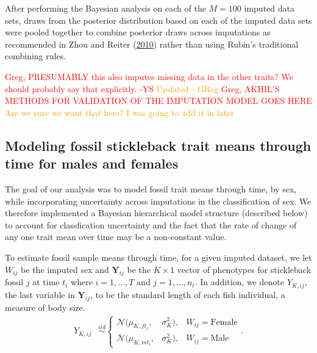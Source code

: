 \documentclass[
  12pt,
]{article}
\begin{document}
After performing the Bayesian analysis on each of the \(M = 100\)
imputed data sets, draws from the posterior distribution based on each
of the imputed data sets were pooled together to combine posterior draws
across imputations as recommended in Zhou and Reiter
(\protect\hyperlink{ref-ZhouReiter2010}{2010}) rather than using Rubin's
traditional combining rules.

\textcolor{red}{Greg, PRESUMABLY this also imputes missing data in the other traits? We should probably say that explicitly. -YS}
\textcolor{orange}{Updated - GReg}
\textcolor{red}{Greg, AKHIL'S METHODS FOR VALIDATION OF THE IMPUTATION MODEL GOES HERE}
\textcolor{orange}{Are we sure we want that here?  I was going to add it in later}

\hypertarget{modeling-fossil-stickleback-trait-means-through-time-for-males-and-females}{%
\subsection{Modeling fossil stickleback trait means through time for
males and
females}\label{modeling-fossil-stickleback-trait-means-through-time-for-males-and-females}}

The goal of our analysis was to model fossil trait means through time,
by sex, while incorporating uncertainty across imputations in the
classification of sex. We therefore implemented a Bayesian hierarchical
model structure (described below) to account for classfication
uncertainty and the fact that the rate of change of any one trait mean
over time may be a non-constant value.

To estimate fossil sample means through time, for a given imputed
dataset, we let \(W_{ij}\) be the imputed sex and
\(\boldsymbol{Y}_{ij}\) be the \(K \times 1\) vector of phenotypes for
stickleback fossil \(j\) at time \(t_i\) where \(i = 1, \ldots, T\) and
\(j = 1,\ldots,n_{t}\). In addition, we denote \(Y_{K,ij}\), the last
variable in \(\boldsymbol{Y}_{ij}\), to be the standard length of each
fish individual, a measure of body size. \begin{align}
{Y}_{K,ij} & \overset{iid}{\sim}\left\{\begin{array}{lll} \mathcal{N}(\mu_{K,ft_i},&\sigma_{K}^2), & W_{ij} = \text{Female} \\ \mathcal{N}(\mu_{K,mt_i},&\sigma_{K}^2), & W_{ij} = \text{Male} \end{array}\right..
\label{eq:stl}
\end{align}
\end{document}
